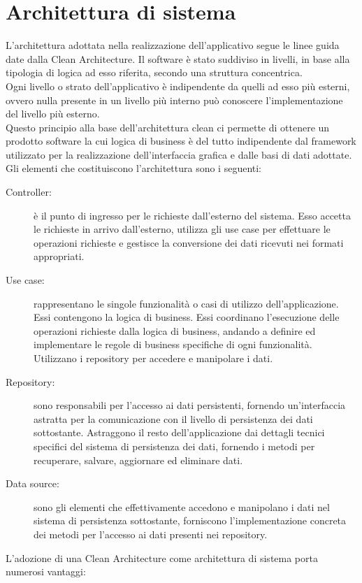 \section{Architettura di sistema} \label{sec:arch}
L'architettura adottata nella realizzazione dell'applicativo segue le linee guida date dalla Clean Architecture. Il software è stato suddiviso in livelli, in base alla tipologia di logica ad esso riferita, secondo una struttura concentrica.\\
Ogni livello o strato dell'applicativo è indipendente da quelli ad esso più esterni, ovvero nulla presente in un livello più interno può conoscere l'implementazione del livello più esterno.\\
Questo principio alla base dell'architettura clean ci permette di ottenere un prodotto software la cui logica di business è del tutto indipendente dal framework utilizzato per la realizzazione dell'interfaccia grafica e dalle basi di dati adottate.\\
Gli elementi che costituiscono l'architettura sono i seguenti:
\begin{description}
    \item[Controller:] è il punto di ingresso per le richieste dall'esterno del sistema. Esso accetta le richieste in arrivo dall'esterno, utilizza gli use case per effettuare le operazioni richieste e gestisce la conversione dei dati ricevuti nei formati appropriati.
    \item[Use case:] rappresentano le singole funzionalità o casi di utilizzo dell'applicazione. Essi contengono la logica di business. Essi coordinano l'esecuzione delle operazioni richieste dalla logica di business, andando a definire ed implementare le regole di business specifiche di ogni funzionalità. Utilizzano i repository per accedere e manipolare i dati.
    \item[Repository:] sono responsabili per l'accesso ai dati persistenti, fornendo un'interfaccia astratta per la comunicazione con il livello di persistenza dei dati sottostante. Astraggono il resto dell'applicazione dai dettagli tecnici specifici del sistema di persistenza dei dati, fornendo i metodi per recuperare, salvare, aggiornare ed eliminare dati.
    \item[Data source:] sono gli elementi che effettivamente accedono e manipolano i dati nel sistema di persistenza sottostante, forniscono l'implementazione concreta dei metodi per l'accesso ai dati presenti nei repository.
\end{description}
L'adozione di una Clean Architecture come architettura di sistema porta numerosi vantaggi:
